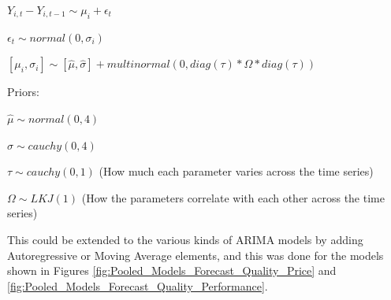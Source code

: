\documentclass{article}
\begin{document}
$Y_{i,t}-Y_{i,t-1} \sim \mu_i + \epsilon_t$

$\epsilon_t \sim normal(0, \sigma_i)$

$[\mu_i, \sigma_i] \sim [\hat{\mu}, \hat{\sigma}] + multinormal(0,diag(\tau)*\Omega*diag(\tau))$

Priors:

$\hat{\mu} \sim normal(0,4)$

$\hat{\sigma} \sim cauchy(0,4)$

$\tau \sim cauchy(0,1)$ (How much each parameter varies across the time series)

$\Omega \sim LKJ(1)$ (How the parameters correlate with each other across the time series)

This could be extended to the various kinds of ARIMA models by adding Autoregressive or Moving Average elements, and this was done for the models shown in Figures \ref{fig:Pooled_Models_Forecast_Quality_Price} and \ref{fig:Pooled_Models_Forecast_Quality_Performance}.
\end{document}
